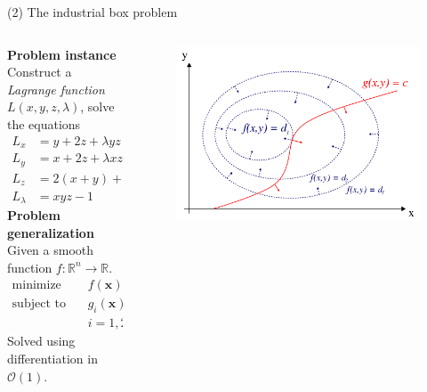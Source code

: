 \documentclass[11pt, aspectratio=149]{beamer}
\theoremstyle{plain}
\begin{document}
\begin{frame}[fragile, t]{(2) The industrial box problem}
	\begin{columns}
		\begin{column}{0.6\textwidth}
			\textbf{Problem instance} \\
			Construct a \emph{Lagrange function} $L(x, y, z, \lambda)$, solve the equations
			\begin{alignat*}{3}
			L_x &= y + 2z + \lambda yz &&= 0 \\
			L_y &=x + 2z + \lambda xz &&= 0 \\
			L_z &=2 (x + y) + \lambda xy &&= 0 \\
			L_\lambda &= xyz - 1 &&= 0
			\end{alignat*}
			\textbf{Problem generalization}
			\\
			\vspace*{0.5em} 
			Given a smooth function $f: \mathbb{R}^{n} \to \mathbb{R}$.
			\begin{align*}
			\text{minimize } \quad & f(\mathbf{x}) \\
			\text{subject to } \quad & g_i(\mathbf{x}) = 0\\
			 & i=1,2,\ldots
			\end{align*}
			Solved using differentiation in $\mathcal{O}(1)$.
		\end{column}
		\begin{column}{0.4\textwidth}%
			\vspace*{-10em}
			\begin{figure}
				\centering
				\includegraphics[width=1.05\linewidth]{figs/lagrange.png}
			\end{figure}
		\end{column}
	\end{columns}
\end{frame}
\end{document}
